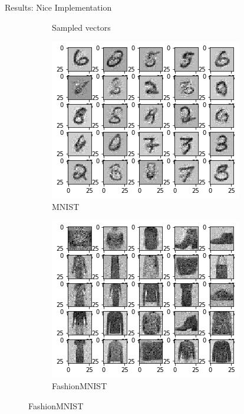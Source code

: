 \begin{frame}{Results: Nice Implementation}
\begin{figure}[htbp!]
\begin{subfigure}[b]{0.3\textwidth}
         \caption{Sampled vectors}
     \end{subfigure} 
     \hfill
     \begin{subfigure}[b]{0.3\textwidth}
         \centering
         \includegraphics[width=\textwidth]{Images/mnist2.png}
         \caption{MNIST}
     \end{subfigure}
     \hfill
     \begin{subfigure}[b]{0.3\textwidth}
         \centering
         \includegraphics[width=\textwidth]{Images/fashion2.png}
         \caption{FashionMNIST}
     \end{subfigure}
\end{figure}
\end{frame}
